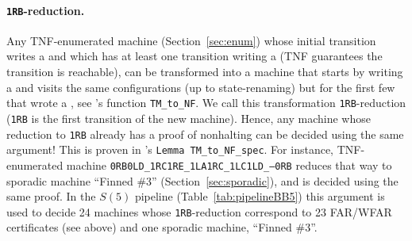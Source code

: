 \enlargethispage{\baselineskip}
\paragraph{\texttt{1RB}-reduction.} Any TNF-enumerated machine (Section~\ref{sec:enum}) whose initial transition writes a \szero and which has at least one transition writing a \sone (TNF guarantees the transition is reachable), can be transformed into a machine that starts by writing a \sone and visits the same configurations (up to state-renaming) but for the first few that wrote a \szero, see \CoqBB's function \texttt{TM\_to\_NF}. We call this transformation \texttt{1RB}-reduction (\texttt{1RB} is the first transition of the new machine). Hence, any machine whose reduction to \texttt{1RB} already has a proof of nonhalting can be decided using the same argument! This is proven in \CoqBB's \texttt{Lemma TM\_to\_NF\_spec}. For instance, TNF-enumerated machine \texttt{0RB0LD\_1RC1RE\_1LA1RC\_1LC1LD\_---0RB} reduces that way to sporadic machine ``Finned \#3'' (Section~\ref{sec:sporadic}), and is decided using the same proof. In the $S(5)$ pipeline (Table~\ref{tab:pipelineBB5}) this argument is used to decide 24 machines whose \texttt{1RB}-reduction correspond to 23 FAR/WFAR certificates (see above) and one sporadic machine, ``Finned \#3''.
